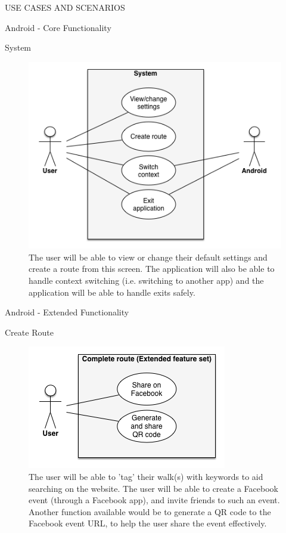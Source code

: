 \documentclass{article}
\begin{document}
\begin{section}{USE CASES AND SCENARIOS}
\begin{subsection}{Android - Core Functionality}
			\clearpage
			\begin{subsubsection}{System}
				\begin{figure}[h!]
					\begin{center}
						\includegraphics[height=0.55\columnwidth]{images/UseCase/Android/Core/System.png}
					\end{center}
					\caption{The user will be able to view or change their default settings and create a route from this screen. The application will also be able to handle context switching (i.e. switching to another app) and the application will be able to handle exits safely.}
				\end{figure}
			\end{subsubsection}
		\end{subsection}
		
		\clearpage
		\begin{subsection}{Android - Extended Functionality}
			\begin{subsubsection}{Create Route}
				\begin{figure}[h!]
					\begin{center}
						\includegraphics[height=0.3\columnwidth]{images/UseCase/Android/Extended/CompleteRoute_Extended.png}
					\end{center}
					\caption{The user will be able to 'tag' their walk(s) with keywords to aid searching on the website. The user will be able to create a Facebook event (through a Facebook app), and invite friends to such an event. Another function available would be to generate a QR code to the Facebook event URL, to help the user share the event effectively.}
				\end{figure}
			\end{subsubsection}
			

\end{subsection}
\end{section}
\end{document}
